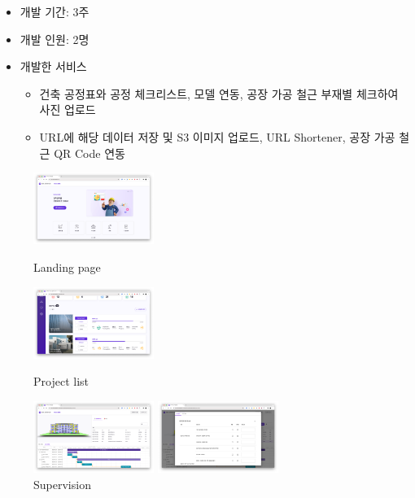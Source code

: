 \begin{itemize}
\begin{itemize}[label=$\star$]
	\item 개발 기간: 3주
	\item 개발 인원: 2명
	\item 개발한 서비스
	      \begin{itemize}
		      \item 건축 공정표와 공정 체크리스트, 모델 연동, 공장 가공 철근 부재별 체크하여 사진 업로드
		      \item URL에 해당 데이터 저장 및 S3 이미지 업로드, URL Shortener, 공장 가공 철근 QR Code 연동
	      \end{itemize}
\end{itemize}
\begin{figure}[!ht]
	\begin{fullwidth}
		\parbox{0.35\textwidth}{
			\centering
			\includegraphics[width=0.35\textwidth]{images/builderhub-supervision-landing-1.png}
			\caption*{Landing page}
		}\qquad
		\parbox{0.35\textwidth}{
			\centering
			\includegraphics[width=0.35\textwidth]{images/builderhub-supervision-project-list.png}
			\caption*{Project list}
		}\qquad
		\parbox{0.35\textwidth}{
			\centering
			\includegraphics[width=0.35\textwidth]{images/builderhub-supervision-main-1.png}
			\caption*{Supervision}
		}\qquad
		\parbox{0.35\textwidth}{
			\centering
			\includegraphics[width=0.35\textwidth]{images/builderhub-supervision-checklist.png}
}
\end{fullwidth}
\end{figure}
\end{itemize}
